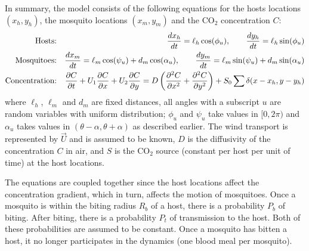 \documentclass[11pt]{article}
\begin{document}
In summary, the model consists of the following equations for the hosts locations $(x_h,y_h)$,
the mosquito locations $(x_m,y_m)$ and the CO$_2$ concentration $C$:
\begin{eqnarray*}
\mbox{Hosts:}&&
\frac{dx_h}{dt} = \ell_h \cos(\phi_u),
\hskip20pt
\frac{dy_h}{dt} = \ell_h \sin(\phi_u) \\
\mbox{Mosquitoes:}&&
\frac{dx_m}{dt} = \ell_m \cos(\psi_u) + d_m \cos(\alpha_u),
\hskip20pt
\frac{dy_m}{dt} = \ell_m \sin(\psi_u) + d_m \sin(\alpha_u) \\
\mbox{Concentration:}&&
\frac{\partial C}{\partial t} + U_1\frac{\partial C}{\partial x}
+ U_2\frac{\partial C}{\partial y} =
D\left( \frac{\partial^2 C}{\partial x^2} + \frac{\partial^2 C}{\partial y^2} \right)
+ S_0 \sum\delta(x-x_h,y-y_h)
\end{eqnarray*}
where $\ell_h$, $\ell_m$ and $d_m$ are fixed distances, all angles with a subscript
$u$ are random variables with uniform distribution; $\phi_u$ and $\psi_u$ take
values in $[0,2\pi)$ and $\alpha_u$ takes values in $(\theta-\alpha,\theta+\alpha)$
as described earlier.  The wind transport is represented by $\vec{U}$ and is assumed
to be known, $D$ is the diffusivity of the concentration $C$ in air, and
$S$ is the CO$_2$ source (constant per host per unit of time) at the host locations.

The equations are coupled together since the host locations affect the concentration
gradient, which in turn, affects the motion of mosquitoes.  Once a mosquito is
within the biting radius $R_b$ of a host, there is a probability $P_b$ of biting.
After biting, there is a probability $P_t$ of transmission to the host.  Both of
these probabilities are assumed to be constant. Once a mosquito has bitten a host,
it no longer participates in the dynamics (one blood meal per mosquito).


\end{document}
